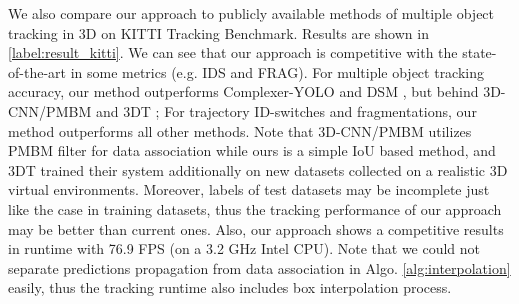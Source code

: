 \documentclass[letterpaper, 10pt, conference]{ieeeconf}  %
\begin{document}
\begin{table}
	\vspace{-0.3cm}
	\caption{Comparison of publicly available methods of 3D multi-object tracking in the KITTI Tracking Benchmark. The time for object detection is not included in the specified runtime.}
	\label{label:result_kitti}
\end{table}

We also compare our approach to publicly available methods of multiple object tracking in 3D on KITTI Tracking Benchmark. Results are shown in \tablename \, \ref{label:result_kitti}. We can see that our approach is competitive with the state-of-the-art in some metrics (e.g. IDS and FRAG). For multiple object tracking accuracy, our method outperforms Complexer-YOLO \cite{Simon_2019_CVPR_Workshops} and DSM \cite{frossard2018end}, but behind 3D-CNN/PMBM \cite{scheidegger2018mono} and 3DT \cite{Hu3DT19}; For trajectory ID-switches and fragmentations, our method outperforms all other methods. Note that 3D-CNN/PMBM utilizes PMBM filter for data association while ours is a simple IoU based method, and 3DT trained their system additionally on new datasets collected on a realistic 3D virtual environments. Moreover, labels of test datasets may be incomplete just like the case in training datasets, thus the tracking performance of our approach may be better than current ones. Also, our approach shows a competitive results in runtime with 76.9 FPS (on a  3.2 GHz Intel CPU). Note that we could not separate predictions propagation from data association in Algo. \ref{alg:interpolation} easily, thus the tracking runtime also includes box interpolation process.
\end{document}
